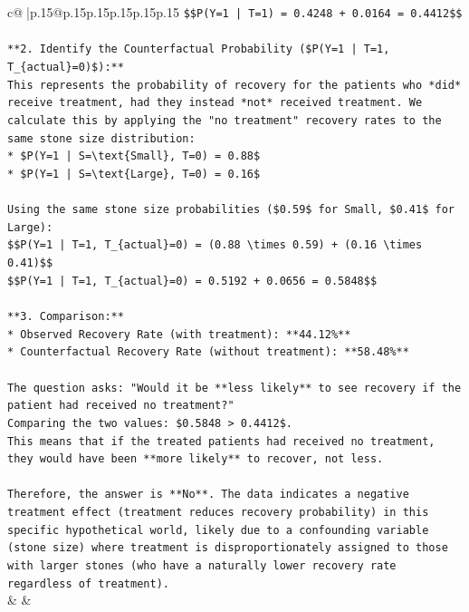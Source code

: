 \documentclass{article}
\begin{document}
{\begin{supertabular}{c@{$\;$}|p{.15\linewidth}@{}p{.15\linewidth}p{.15\linewidth}p{.15\linewidth}p{.15\linewidth}p{.15\linewidth}}
{{{\texttt{\$\$P(Y=1 | T=1) = 0.4248 + 0.0164 = 0.4412\$\$} \\
\\ 
\texttt{**2. Identify the Counterfactual Probability (\$P(Y=1 | T=1, T\_\{actual\}=0)\$):**} \\
\texttt{This represents the probability of recovery for the patients who *did* receive treatment, had they instead *not* received treatment. We calculate this by applying the "no treatment" recovery rates to the same stone size distribution:} \\
\texttt{*   \$P(Y=1 | S=\textbackslash{}text\{Small\}, T=0) = 0.88\$} \\
\texttt{*   \$P(Y=1 | S=\textbackslash{}text\{Large\}, T=0) = 0.16\$} \\
\\ 
\texttt{Using the same stone size probabilities (\$0.59\$ for Small, \$0.41\$ for Large):} \\
\texttt{\$\$P(Y=1 | T=1, T\_\{actual\}=0) = (0.88 \textbackslash{}times 0.59) + (0.16 \textbackslash{}times 0.41)\$\$} \\
\texttt{\$\$P(Y=1 | T=1, T\_\{actual\}=0) = 0.5192 + 0.0656 = 0.5848\$\$} \\
\\ 
\texttt{**3. Comparison:**} \\
\texttt{*   Observed Recovery Rate (with treatment): **44.12\%**} \\
\texttt{*   Counterfactual Recovery Rate (without treatment): **58.48\%**} \\
\\ 
\texttt{The question asks: "Would it be **less likely** to see recovery if the patient had received no treatment?"} \\
\texttt{Comparing the two values: \$0.5848 > 0.4412\$.} \\
\texttt{This means that if the treated patients had received no treatment, they would have been **more likely** to recover, not less.} \\
\\ 
\texttt{Therefore, the answer is **No**. The data indicates a negative treatment effect (treatment reduces recovery probability) in this specific hypothetical world, likely due to a confounding variable (stone size) where treatment is disproportionately assigned to those with larger stones (who have a naturally lower recovery rate regardless of treatment).} \\
            }
        }
    }
    & & \\ \\


\end{supertabular}}
\end{document}
